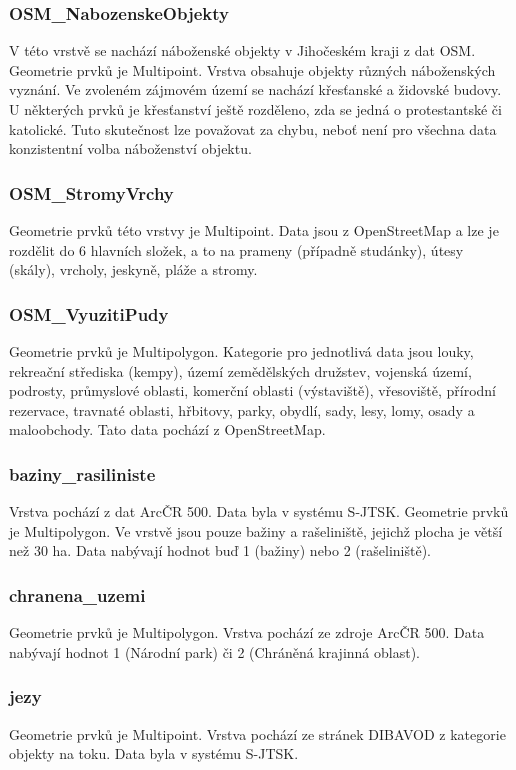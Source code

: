 \documentclass[a4paper, 12pt]{article}
\begin{document}
\subsubsection{OSM\_NabozenskeObjekty}
V této vrstvě se nachází náboženské objekty v Jihočeském kraji z dat OSM. Geometrie prvků je Multipoint. Vrstva obsahuje objekty různých náboženských vyznání. Ve zvoleném zájmovém území se nachází křesťanské a židovské budovy. U některých prvků je křesťanství ještě rozděleno, zda se jedná o protestantské či katolické. Tuto skutečnost lze považovat za chybu, neboť není pro všechna data konzistentní volba náboženství objektu.

\subsubsection{OSM\_StromyVrchy}
Geometrie prvků této vrstvy je Multipoint. Data jsou z OpenStreetMap a lze je rozdělit do 6 hlavních složek, a to na prameny (případně studánky), útesy (skály), vrcholy, jeskyně, pláže a stromy.

\subsubsection{OSM\_VyuzitiPudy}
Geometrie prvků je Multipolygon. Kategorie pro jednotlivá data jsou louky, rekreační střediska (kempy), území zemědělských družstev, vojenská území, podrosty, průmyslové oblasti, komerční oblasti (výstaviště), vřesoviště, přírodní rezervace, travnaté oblasti, hřbitovy, parky, obydlí, sady, lesy, lomy, osady a maloobchody. Tato data pochází z OpenStreetMap.


\subsubsection{baziny\_rasiliniste}
Vrstva pochází z dat ArcČR 500. Data byla v systému S-JTSK. Geometrie prvků je Multipolygon. Ve vrstvě jsou pouze bažiny a rašeliniště, jejichž plocha je větší než 30 ha. Data nabývají hodnot buď 1 (bažiny) nebo 2 (rašeliniště).

\subsubsection{chranena\_uzemi}
Geometrie prvků je Multipolygon. Vrstva pochází ze zdroje ArcČR 500. Data nabývají hodnot 1 (Národní park) či 2 (Chráněná krajinná oblast).

\subsubsection{jezy}
Geometrie prvků je Multipoint. Vrstva pochází ze stránek DIBAVOD z kategorie objekty na toku. Data byla v systému S-JTSK.
\end{document}
